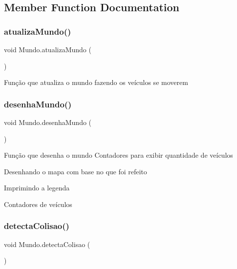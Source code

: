 \subsection{Member Function Documentation}
\mbox{\label{classMundo_ab2de7a750f9e410a7e10ac707b5bf500}} 
\subsubsection{\texorpdfstring{atualiza\+Mundo()}{atualizaMundo()}}
{\footnotesize\ttfamily void Mundo.\+atualiza\+Mundo (\begin{DoxyParamCaption}{ }\end{DoxyParamCaption})\hspace{0.3cm}{\ttfamily [inline]}}

Função que atualiza o mundo fazendo os veículos se moverem \mbox{\label{classMundo_adbafcb32f5f209eda97e1c7953c6e599}} 
\subsubsection{\texorpdfstring{desenha\+Mundo()}{desenhaMundo()}}
{\footnotesize\ttfamily void Mundo.\+desenha\+Mundo (\begin{DoxyParamCaption}{ }\end{DoxyParamCaption})\hspace{0.3cm}{\ttfamily [inline]}}

Função que desenha o mundo Contadores para exibir quantidade de veículos

Desenhando o mapa com base no que foi refeito

Imprimindo a legenda

Contadores de veículos\mbox{\label{classMundo_ac5525a65a2bc9c8b333c6594aa9503ca}} 
\subsubsection{\texorpdfstring{detecta\+Colisao()}{detectaColisao()}}
{\footnotesize\ttfamily void Mundo.\+detecta\+Colisao (\begin{DoxyParamCaption}{ }\end{DoxyParamCaption})\hspace{0.3cm}{\ttfamily [inline]}}

